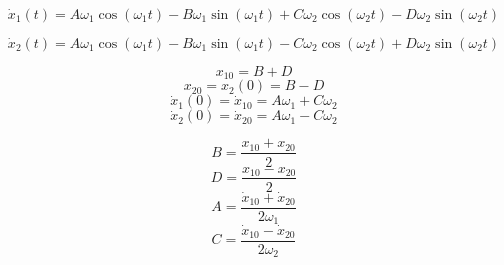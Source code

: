 \documentclass[a4paper, 12pt]{article}
\begin{document}
\[\dot{x}_{1}(t)=A\omega_{1}\cos(\omega_{1}t)-B\omega_{1}\sin(\omega_{1}t)+C\omega_{2}\cos(\omega_{2}t)-D\omega_{2}\sin(\omega_{2}t)\]

\[\dot{x}_{2}(t)=A\omega_{1}\cos(\omega_{1}t)-B\omega_{1}\sin(\omega_{1}t)-C\omega_{2}\cos(\omega_{2}t)+D\omega_{2}\sin(\omega_{2}t)\]

\[x_{10}=B+D\]
\[x_{20}=x_{2}(0)=B-D\]
\[\dot{x}_{1}(0)=\dot{x}_{10}=A\omega _{1}+C\omega _{2}\]
\[\dot{x}_{2}(0)=\dot{x}_{20}=A\omega _{1}-C\omega _{2}\]

\[B = \frac{x_{10}+x_{20}}{2}\]
\[D = \frac{x_{10}-x_{20}}{2}\]
\[A = \frac{\dot{x}_{10}+\dot{x}_{20}}{2\omega _{1}}\]
\[C = \frac{\dot{x}_{10}-\dot{x}_{20}}{2\omega _{2}}\]
 
\end{document}
